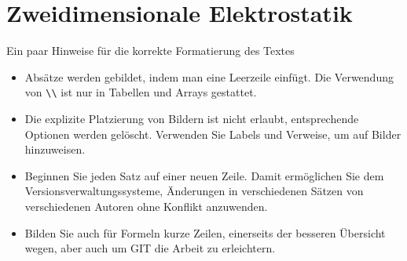 %
%
%
%
\chapter{Zweidimensionale Elektrostatik\label{chapter:elektro}}
\begin{refsection}

Ein paar Hinweise für die korrekte Formatierung des Textes
\begin{itemize}
\item
Absätze werden gebildet, indem man eine Leerzeile einfügt.
Die Verwendung von \verb+\\+ ist nur in Tabellen und Arrays gestattet.
\item
Die explizite Platzierung von Bildern ist nicht erlaubt, entsprechende
Optionen werden gelöscht. 
Verwenden Sie Labels und Verweise, um auf Bilder hinzuweisen.
\item
Beginnen Sie jeden Satz auf einer neuen Zeile. 
Damit ermöglichen Sie dem Versionsverwaltungssysteme, Änderungen
in verschiedenen Sätzen von verschiedenen Autoren ohne Konflikt 
anzuwenden.
\item 
Bilden Sie auch für Formeln kurze Zeilen, einerseits der besseren
Übersicht wegen, aber auch um GIT die Arbeit zu erleichtern.
\end{itemize}






\printbibliography[heading=subbibliography]
\end{refsection}
